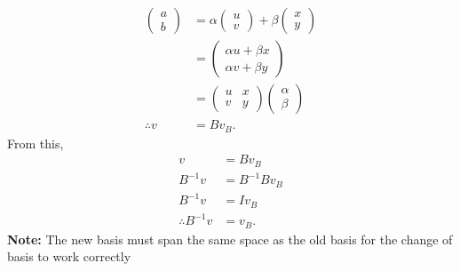 \documentclass{report}
\begin{document}
\begin{itemize}
\begin{align*}
                \begin{pmatrix} a \\ b \end{pmatrix} &= \alpha \begin{pmatrix} u \\ v\end{pmatrix} + \beta \begin{pmatrix} x \\ y\end{pmatrix} \\
                                                     &= \begin{pmatrix} \alpha u + \beta x \\ \alpha v + \beta y \end{pmatrix} \\
                                                     &= \begin{pmatrix} u & x \\ v & y \end{pmatrix}\begin{pmatrix} \alpha \\ \beta \end{pmatrix} \\
                \therefore v &= Bv_{B}
            .\end{align*}
            From this, 
            \begin{align*}
                v & = Bv_{B} \\
                B^{-1}v &= B^{-1}Bv_{B} \\
                B^{-1}v &= I v_{B} \\
                \therefore B^{-1}v &= v_{B}
            .\end{align*}
            \bigbreak \noindent 
            \textbf{Note:} The new basis must span the same space as the old basis for the change of basis to work correctly

\end{itemize}
\end{document}
